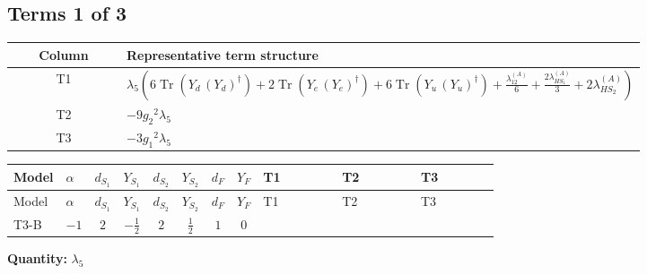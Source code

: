 \documentclass[8pt]{article}
\begin{document}
\begin{landscape}
\subsection*{Terms 1 of 3}
\begin{center}
\begin{tabular}{@{}c >{\raggedright\arraybackslash}p{0.82\linewidth}@{}}
\toprule
Column & Representative term structure \\
\midrule
T1 & \(\displaystyle {\lambda_5} \left(6 \operatorname{Tr}\!\left({Y_d}\,\left({Y_d}\right)^{\dagger}\right)+2 \operatorname{Tr}\!\left({Y_e}\,\left({Y_e}\right)^{\dagger}\right)+6 \operatorname{Tr}\!\left({Y_u}\,\left({Y_u}\right)^{\dagger}\right)+\frac{{\lambda_{12}^{(A)}}}{6}+\frac{2 {\lambda_{HS_1}^{(A)}}}{3}+2 {\lambda_{HS_2}^{(A)}}\right)\) \\
\midrule
T2 & \(\displaystyle -9 {g_2}^2 {\lambda_5}\) \\
\midrule
T3 & \(\displaystyle -3 {g_1}^2 {\lambda_5}\) \\
\midrule
\bottomrule
\end{tabular}
\end{center}
\smallskip
\tiny
\begin{longtable}{@{}llcccccc >{\raggedright\arraybackslash}p{0.21\linewidth} >{\raggedright\arraybackslash}p{0.21\linewidth} >{\raggedright\arraybackslash}p{0.21\linewidth}@{}}
\toprule
Model & $\alpha$ & $d_{S_1}$ & $Y_{S_1}$ & $d_{S_2}$ & $Y_{S_2}$ & $d_F$ & $Y_F$ & T1 & T2 & T3 \\
\midrule
\endfirsthead
\toprule
Model & $\alpha$ & $d_{S_1}$ & $Y_{S_1}$ & $d_{S_2}$ & $Y_{S_2}$ & $d_F$ & $Y_F$ & T1 & T2 & T3 \\
\midrule
\endhead
T3-B & $-1$ & $2$ & $-\frac{1}{2}$ & $2$ & $\frac{1}{2}$ & $1$ & $0$ & \scriptsize\adjustbox{max width=\linewidth}{$\begin{gathered} {\lambda_5} \left(6 \operatorname{Tr}\!\left({Y_d}\,\left({Y_d}\right)^{\dagger}\right)+2 \operatorname{Tr}\!\left({Y_e}\,\left({Y_e}\right)^{\dagger}\right)+6 \operatorname{Tr}\!\left({Y_u}\,\left({Y_u}\right)^{\dagger}\right)+\frac{{\lambda_{12}^{(A)}}}{6}+\frac{2 {\lambda_{HS_1}^{(A)}}}{3}+2 {\lambda_{HS_2}^{(A)}}\right)\end{gathered}$} & \scriptsize\adjustbox{max width=\linewidth}{$\begin{gathered} -9 {g_2}^2 {\lambda_5}\end{gathered}$} & \scriptsize\adjustbox{max width=\linewidth}{$\begin{gathered} -3 {g_1}^2 {\lambda_5}\end{gathered}$} \\
\midrule
\bottomrule
\end{longtable}
\clearpage
\noindent\textbf{Quantity: }$\lambda_5$\par\smallskip

\end{landscape}
\end{document}
